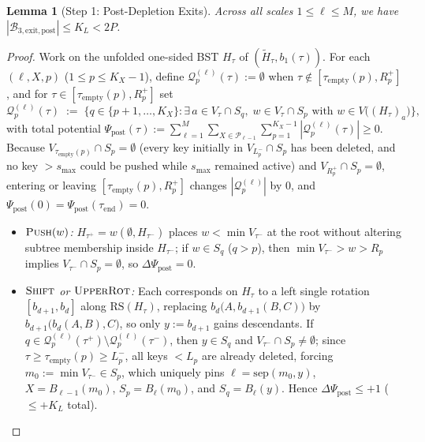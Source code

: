 \documentclass[11pt]{article}
\newtheorem{lemma}[theorem]{Lemma}
\theoremstyle{definition}
\theoremstyle{remark}
\newcommand{\RS}{\mathrm{RS}}
\newcommand{\sep}{\mathrm{sep}}
\newcommand{\PUSH}{\textnormal{\scshape Push}}
\newcommand{\SHIFT}{\textnormal{\scshape Shift}}
\newcommand{\UPROT}{\textnormal{\scshape UpperRot}}
\begin{document}
\begin{lemma}[Step 1: Post-Depletion Exits]
\label{lem:b3-post}
Across all scales $1 \le \ell \le M$, we have $|\mathcal{B}_{3,\mathrm{exit,post}}| \le K_L < 2P$.
\end{lemma}

\begin{proof}
Work on the unfolded one-sided BST $H_\tau$ of $(\widetilde{H}_\tau, b_1(\tau))$. For each $(\ell, X, p)$ ($1 \le p \le K_X - 1$), define $\mathcal{Q}_p^{(\ell)}(\tau) := \emptyset$ when $\tau \notin [\tau_{\mathrm{empty}}(p), R_p^+]$, and for $\tau \in [\tau_{\mathrm{empty}}(p), R_p^+]$ set
\[
\mathcal{Q}_p^{(\ell)}(\tau) \;:=\; \Big\{ q \in \{p + 1, \dots, K_X\} : \exists\, a \in V_\tau \cap S_q,\; w \in V_\tau \cap S_p \text{ with } w \in V\big((H_\tau)_a\big) \Big\},
\]
with total potential $\Psi_{\mathrm{post}}(\tau) := \sum_{\ell=1}^M \sum_{X \in \mathcal{P}_{\ell-1}} \sum_{p=1}^{K_X - 1} |\mathcal{Q}_p^{(\ell)}(\tau)| \ge 0$. Because $V_{\tau_{\mathrm{empty}}(p)} \cap S_p = \emptyset$ (every key initially in $V_{L_p^-} \cap S_p$ has been deleted, and no key $> s_{\max}$ could be pushed while $s_{\max}$ remained active) and $V_{R_p^+} \cap S_p = \emptyset$, entering or leaving $[\tau_{\mathrm{empty}}(p), R_p^+]$ changes $|\mathcal{Q}_p^{(\ell)}|$ by $0$, and $\Psi_{\mathrm{post}}(0) = \Psi_{\mathrm{post}}(\tau_{\mathrm{end}}) = 0$.
\begin{itemize}[leftmargin=2em]
  \item \emph{$\PUSH(w)$:} $H_{\tau^+} = w(\emptyset, H_{\tau^-})$ places $w < \min V_{\tau^-}$ at the root without altering subtree membership inside $H_{\tau^-}$; if $w \in S_q$ ($q > p$), then $\min V_{\tau^-} > w > R_p$ implies $V_{\tau^-} \cap S_p = \emptyset$, so $\Delta\Psi_{\mathrm{post}} = 0$.
  \item \emph{$\SHIFT$ or $\UPROT$:} Each corresponds on $H_\tau$ to a left single rotation $[b_{d+1}, b_d]$ along $\RS(H_\tau)$, replacing $b_d\big(A, b_{d+1}(B, C)\big)$ by $b_{d+1}\big(b_d(A, B), C\big)$, so only $y := b_{d+1}$ gains descendants. If $q \in \mathcal{Q}_p^{(\ell)}(\tau^+) \setminus \mathcal{Q}_p^{(\ell)}(\tau^-)$, then $y \in S_q$ and $V_{\tau^-} \cap S_p \ne \emptyset$; since $\tau \ge \tau_{\mathrm{empty}}(p) \ge L_p^-$, all keys $< L_p$ are already deleted, forcing $m_0 := \min V_{\tau^-} \in S_p$, which uniquely pins $\ell = \sep(m_0, y)$, $X = B_{\ell-1}(m_0)$, $S_p = B_\ell(m_0)$, and $S_q = B_\ell(y)$. Hence $\Delta\Psi_{\mathrm{post}} \le +1$ ($\le +K_L$ total).

\end{itemize}
\end{proof}
\end{document}
